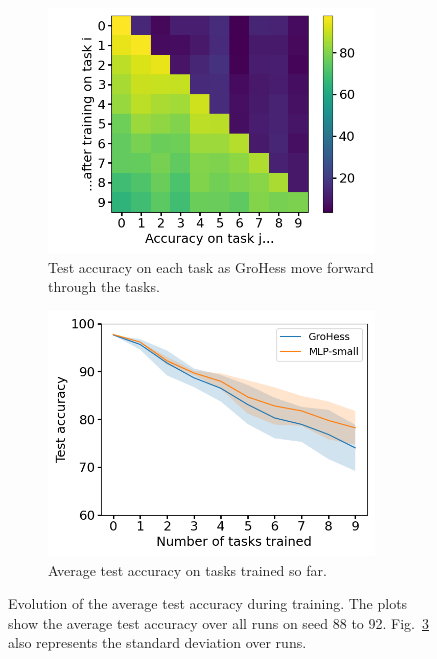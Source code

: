 \documentclass[11pt]{article}
\begin{document}
\begin{figure}
    \centering
    \begin{subfigure}[b]{0.35\textwidth}
        \centering
        \includegraphics[width=0.95\textwidth]{images/accs_matrix.png}
        \caption{Test accuracy on each task as GroHess move forward through the tasks.}
        \label{fig:test_accs_matrix}
    \end{subfigure}
    \hspace{-0mm}
    \begin{subfigure}[b]{0.35\textwidth}
        \centering
        \includegraphics[width=0.95\textwidth]{images/agg_avg_acc_curve.png}
        \caption{Average test accuracy on tasks trained so far.}
        \label{fig:classic_plot}
    \end{subfigure}
    \caption{Evolution of the average test accuracy during training. The plots show the average test accuracy over all runs on seed 88 to 92. Fig.~\ref{fig:classic_plot} also represents the standard deviation over runs.}
\end{figure}
\end{document}
